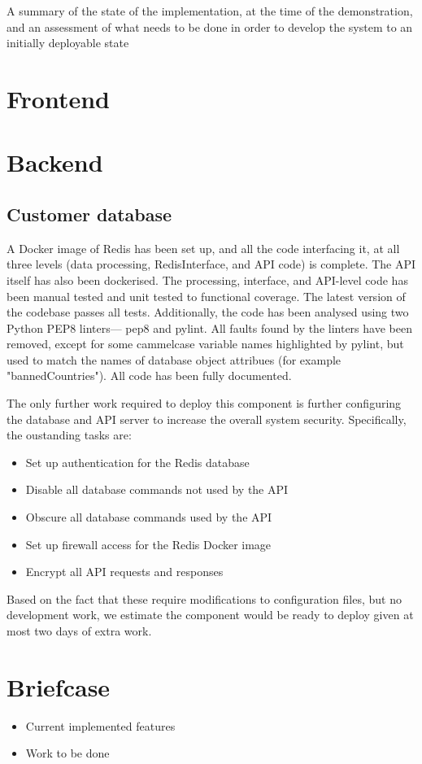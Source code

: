 A summary of the state of the implementation, at the time of the demonstration, and an assessment of what needs to be done in order to develop the system to an initially deployable state

\section{Frontend}
\section{Backend}
\subsection{Customer database}
\begin{flushleft}
A Docker image of Redis has been set up, and all the code interfacing it, at all three levels (data processing, RedisInterface, and API code) is complete. The API itself has also been dockerised. The processing, interface, and API-level code has been manual tested and unit tested to functional coverage. The latest version of the codebase passes all tests. Additionally, the code has been analysed using two Python PEP8 linters--- pep8 and pylint. All faults found by the linters have been removed, except for some cammelcase variable names highlighted by pylint, but used to match the names of database object attribues (for example "bannedCountries"). All code has been fully documented.
\end{flushleft}
\begin{flushleft}
The only further work required to deploy this component is further configuring the database and API server to increase the overall system security. Specifically, the oustanding tasks are:
\end{flushleft}
\begin{itemize}
    \item Set up authentication for the Redis database
    \item Disable all database commands not used by the API
    \item Obscure all database commands used by the API
    \item Set up firewall access for the Redis Docker image
    \item Encrypt all API requests and responses
\end{itemize}
\begin{flushleft}
Based on the fact that these require modifications to configuration files, but no development work, we estimate the component would be ready to deploy given at most two days of extra work.
\end{flushleft}
\section{Briefcase}

\begin{itemize}
    \item Current implemented features
    \item Work to be done
\end{itemize}